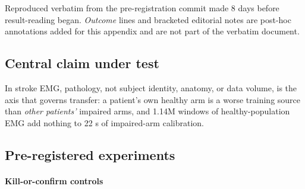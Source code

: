 \documentclass{article}
\begin{document}
Reproduced verbatim from the pre-registration commit made 8 days before result-reading began. \emph{Outcome} lines and bracketed editorial notes are post-hoc annotations added for this appendix and are not part of the verbatim document.

\subsection{Central claim under test}

In stroke EMG, pathology, not subject identity, anatomy, or data volume, is the axis that governs transfer: a patient's own healthy arm is a worse training source than \emph{other patients'} impaired arms, and 1.14M windows of healthy-population EMG add nothing to 22 s of impaired-arm calibration.

\subsection{Pre-registered experiments}

\paragraph{Kill-or-confirm controls}
\end{document}
